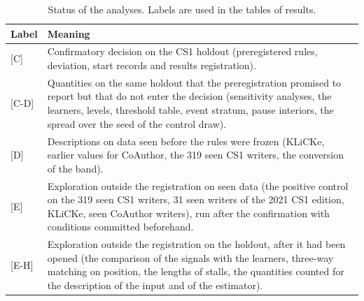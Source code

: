 \begin{table}
  \caption{Status of the analyses. Labels are used in the tables of results.}
  \label{tab:status}
  \centering\small
  \begin{tabularx}{\linewidth}{l >{\raggedright\arraybackslash}X}
    \toprule
    Label & Meaning \\
    \midrule
    {[C]} & Confirmatory decision on the CS1 holdout (preregistered rules, deviation, start records and results
    registration). \\
    {[C-D]} & Quantities on the same holdout that the preregistration promised to report but that do not enter the
    decision (sensitivity analyses, the learners, levels, threshold table, event stratum, pause interiors, the spread
    over the seed of the control draw). \\
    {[D]} & Descriptions on data seen before the rules were frozen (KLiCKe, earlier values for CoAuthor, the 319 seen
    CS1 writers, the conversion of the band). \\
    {[E]} & Exploration outside the registration on seen data (the positive control on the 319 seen CS1 writers, 31
    seen writers of the 2021 CS1 edition, KLiCKe, seen CoAuthor writers), run after the confirmation with conditions
    committed beforehand. \\
    {[E-H]} & Exploration outside the registration on the holdout, after it had been opened (the comparison of the
    signals with the learners, three-way matching on position, the lengths of stalls, the quantities counted for the
    description of the input and of the estimator). \\
    \bottomrule
  \end{tabularx}
\end{table}

